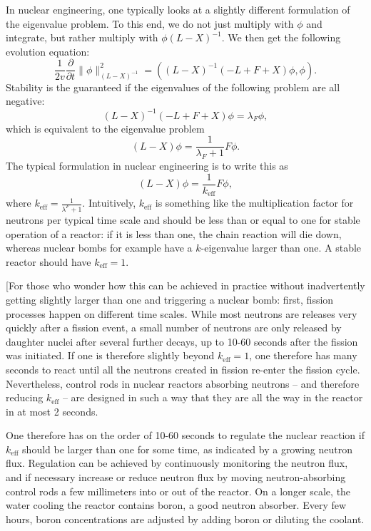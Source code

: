 \documentclass{article}
\begin{document}
In nuclear engineering, one typically looks at a slightly different
formulation of the eigenvalue problem. To this end, we do not just multiply
with $\phi$ and integrate, but rather multiply with $\phi(L-X)^{-1}$. We then
get the following evolution equation:
\begin{equation}
  \frac 1{2v} \frac{\partial}{\partial t}  \|\phi\|^2_{(L-X)^{-1}} = ((L-X)^{-1}(-L+F+X)\phi,\phi).
\end{equation}
Stability is the guaranteed if the eigenvalues of the following problem are
all negative:
\begin{equation}
  (L-X)^{-1}(-L+F+X)\phi = \lambda_F \phi,
\end{equation}
which is equivalent to the eigenvalue problem
\begin{equation}
  (L-X)\phi = \frac 1{\lambda_F+1} F \phi.
\end{equation}
The typical formulation in nuclear engineering is to write this as
\begin{equation}
  (L-X) \phi = \frac 1{k_{\mathrm{eff}}} F \phi,
\end{equation}
where $k_{\mathrm{eff}}=\frac 1{\lambda^F+1}$.
Intuitively, $k_{\mathrm{eff}}$ is something like the multiplication
factor for neutrons per typical time scale and should be less than or equal to
one for stable operation of a reactor: if it is less than one, the chain reaction will
die down, whereas nuclear bombs for example have a $k$-eigenvalue larger than
one. A stable reactor should have $k_{\mathrm{eff}}=1$.

[For those who wonder how this can be achieved in practice without
inadvertently getting slightly larger than one and triggering a nuclear bomb:
first, fission processes happen on different time scales. While most neutrons
are releases very quickly after a fission event, a small number of neutrons
are only released by daughter nuclei after several further decays, up to 10-60
seconds after the fission was initiated. If one is therefore slightly beyond
$k_{\mathrm{eff}}=1$, one therefore has many seconds to react until all the
neutrons created in fission re-enter the fission cycle. Nevertheless, control
rods in nuclear reactors absorbing neutrons -- and therefore reducing
$k_{\mathrm{eff}}$ -- are designed in such a way that they are all the way in
the reactor in at most 2 seconds. 

One therefore has on the order of 10-60 seconds to regulate the nuclear reaction
if $k_{\mathrm{eff}}$ should be larger than one for some time, as indicated by
a growing neutron flux. Regulation can be achieved by continuously monitoring
the neutron flux, and if necessary increase or reduce neutron flux by moving
neutron-absorbing control rods a few millimeters into or out of the
reactor. On a longer scale, the water cooling the reactor contains boron, a
good neutron absorber. Every few hours, boron concentrations are adjusted by
adding boron or diluting the coolant.
\end{document}
